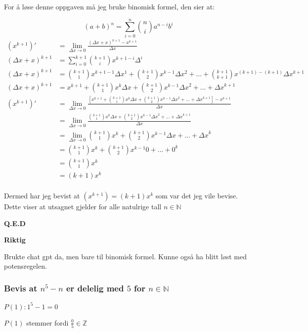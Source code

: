 \documentclass{article}
\begin{document}
For å løse denne oppgaven må jeg bruke binomisk formel, den sier at:

$$(a+b)^n=\sum_{i=0}^{n}\binom{n}{i}a^{n-i}b^i$$
\begin{align*}
    (x^{k+1})' &= \lim_{\Delta x \rightarrow 0} \frac{(\Delta x + x)^{k+1} - x^{k+1}}{\Delta x} \\
    (\Delta x + x)^{k+1} &= \sum_{i=0}^{k+1}\binom{k+1}{i}x^{k+1-i}\Delta^i \\
    (\Delta x + x)^{k+1} &= \binom{k+1}{1}x^{k+1-1}\Delta x^1+\binom{k+1}{2}x^{k-1}\Delta x^2+...+\binom{k+1}{k+1}x^{(k+1)-(k+1)} \Delta x ^{k+1} \\
    (\Delta x + x)^{k+1} &= x^{k+1}+\binom{k+1}{1}x^k\Delta x + \binom{k+1}{2}x^{k-1}{\Delta x} ^2+...+{\Delta x}^{k+1} \\
    (x^{k+1})' &= \lim_{\Delta x \rightarrow 0} \frac{[x^{k+1}+\binom{k+1}{1}x^k\Delta x + \binom{k+1}{2}x^{k-1}{\Delta x} ^2+...+{\Delta x}^{k+1}] - x^{k+1}}{\Delta x} \\
    &= \lim_{\Delta x \rightarrow 0} \frac{\binom{k+1}{1}x^k\Delta x + \binom{k+1}{2}x^{k-1}{\Delta x} ^2+...+{\Delta x}^{k+1}}{\Delta x} \\
    &= \lim_{\Delta x \rightarrow 0} \binom{k+1}{1}x^k + \binom{k+1}{2} x^{k-1} \Delta x + ... + {\Delta x}^k \\
    &= \binom{k+1}{1}x^k+\binom{k+1}{2}x^{k-1}0+...+0^k \\
    &= \binom{k+1}{1}x^k \\
    &= (k+1)x^k \\
\end{align*}

Dermed har jeg bevist at $(x^{k+1})=(k+1)x^k$ som var det jeg vile bevise. Dette viser at utsagnet gjelder for alle natulrige tall $n \in \mathbb{N}$

\textbf{Q.E.D}

\textbf{Riktig}

Brukte chat gpt da, men bare til binomisk formel. Kunne også ha blitt løst med potensregelen.

\newpage

\subsubsection{Bevis at $n^5-n$ er delelig med $5$ for $n \in \mathbb{N}$}

$P(1): 1^5-1=0$

$P(1)$ stemmer fordi $\frac{0}{5}\in \mathbb{Z}$
\end{document}
